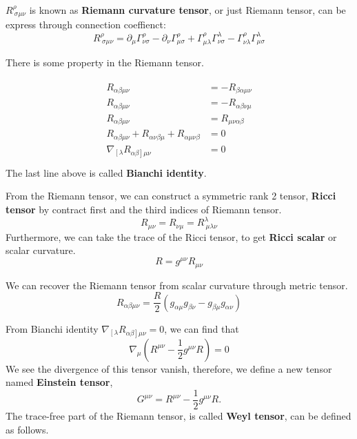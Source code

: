 \documentclass[12pt]{article}
\theoremstyle{mystyle}{\newtheorem{definition}{Definition}[section]}
\theoremstyle{mystyle}{\newtheorem{theorem}[definition]{Theorem}}
\theoremstyle{mystyle}{\newtheorem*{remark}{Remark}}
\theoremstyle{mystyle}{\newtheorem*{example}{Example}}
\theoremstyle{mystyle}{\newtheorem*{examples}{Examples}}
\theoremstyle{cstyle}{\newtheorem*{cthm}{}}
\begin{document}
\begin{definition}
  \(R^{\rho}_{\ \sigma\mu\nu}\) is known as \textbf{Riemann curvature tensor}, or just Riemann tensor,
  can be express through connection coeffienct: \[R^{\rho}_{\ \sigma\mu\nu} =
    \partial_{\mu} \Gamma^{\rho}_{\nu\sigma} -
    \partial_{\nu} \Gamma^{\rho}_{\mu\sigma} +
    \Gamma^{\rho}_{\mu\lambda}\Gamma^{\lambda}_{\nu\sigma} -
    \Gamma^{\rho}_{\nu\lambda}\Gamma^{\lambda}_{\mu\sigma}
  \]
\end{definition}
There is some property in the Riemann tensor.

\begin{cthm}
  \begin{align*}
    \begin{split}
      R_{\alpha\beta\mu\nu} &= -R_{\beta\alpha\mu\nu}\\
      R_{\alpha\beta\mu\nu} &= -R_{\alpha\beta\nu\mu}\\
      R_{\alpha\beta\mu\nu} &= R_{\mu\nu\alpha\beta}\\
      R_{\alpha\beta\mu\nu} + R_{\alpha\nu\beta\mu} + R_{\alpha\mu\nu\beta} &= 0 \\
      \nabla_{\left[ \lambda \right.} R_{\left.\alpha\beta \right] \mu\nu} &= 0 \\
    \end{split}
  \end{align*}
  The last line above is called \textbf{Bianchi identity}.
\end{cthm}

\begin{definition}
  From the Riemann tensor, we can construct a symmetric rank 2 tensor, \textbf{Ricci tensor}
  by contract first and the third indices of Riemann tensor.
  \[R_{\mu\nu} = R_{\nu\mu} = R^{\lambda}_{\ \mu\lambda\nu}\]
  Furthermore, we can take the trace of the Ricci tensor, to get \textbf{Ricci scalar} or scalar curvature.
  \[R = g^{\mu\nu}R_{\mu\nu}\]
\end{definition}

We can recover the Riemann tensor from scalar curvature through metric tensor.
\[R_{\alpha\beta\mu\nu} = \frac{R}{2}(g_{\alpha\mu}g_{\beta\nu}-g_{\beta\mu}g_{\alpha\nu})\]

From Bianchi identity \(\nabla_{\left[ \lambda \right.} R_{\left.\alpha\beta \right] \mu\nu} = 0\),
we can find that \[\nabla_{\mu}(R^{\mu\nu}-\frac{1}{2}g^{\mu\nu}R) = 0\]
We see the divergence of this tensor vanish, therefore, we define a new tensor named \textbf{Einstein tensor},
\[G^{\mu\nu}=R^{\mu\nu}-\frac{1}{2}g^{\mu\nu}R. \]
The trace-free part of the Riemann tensor, is called \textbf{Weyl tensor}, can be defined as follows.
\end{document}
